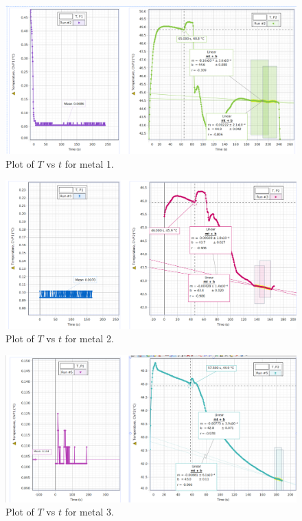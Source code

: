 \documentclass[12pt]{article}
\begin{document}
        \begin{figure}[H]
            \centering
            \includegraphics[width=0.9\linewidth]{f1.png}
            \caption{Plot of \(T\) vs \(t\) for metal 1.}
        \end{figure}
        \begin{figure}[H]
            \centering
            \includegraphics[width=0.9\linewidth]{f2.png}
            \caption{Plot of \(T\) vs \(t\) for metal 2.}
        \end{figure}
        \begin{figure}[H]
            \centering
            \includegraphics[width=0.9\linewidth]{f3.png}
            \caption{Plot of \(T\) vs \(t\) for metal 3.}
        \end{figure}
\end{document}
